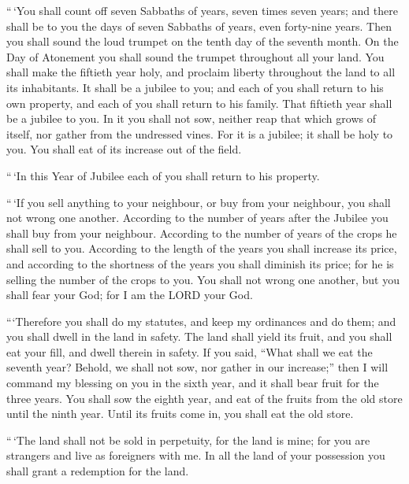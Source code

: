  ``\,`You shall count off seven Sabbaths of years, seven
times seven years; and there shall be to you the days of seven Sabbaths
of years, even forty-nine years.  Then you shall sound the
loud trumpet on the tenth day of the seventh month. On the Day of
Atonement you shall sound the trumpet throughout all your land.
 You shall make the fiftieth year holy, and proclaim
liberty throughout the land to all its inhabitants. It shall be a
jubilee to you; and each of you shall return to his own property, and
each of you shall return to his family.  That fiftieth year
shall be a jubilee to you. In it you shall not sow, neither reap that
which grows of itself, nor gather from the undressed vines.
 For it is a jubilee; it shall be holy to you. You shall
eat of its increase out of the field.

 ``\,`In this Year of Jubilee each of you shall return to
his property.

 ``\,`If you sell anything to your neighbour, or buy from
your neighbour, you shall not wrong one another.  According
to the number of years after the Jubilee you shall buy from your
neighbour. According to the number of years of the crops he shall sell
to you.  According to the length of the years you shall
increase its price, and according to the shortness of the years you
shall diminish its price; for he is selling the number of the crops to
you.  You shall not wrong one another, but you shall fear
your God; for I am the LORD your God.

 ```Therefore you shall do my statutes, and keep my
ordinances and do them; and you shall dwell in the land in safety.
 The land shall yield its fruit, and you shall eat your
fill, and dwell therein in safety.  If you said, ``What
shall we eat the seventh year? Behold, we shall not sow, nor gather in
our increase;''  then I will command my blessing on you in
the sixth year, and it shall bear fruit for the three years.
 You shall sow the eighth year, and eat of the fruits from
the old store until the ninth year. Until its fruits come in, you shall
eat the old store.

 ``\,`The land shall not be sold in perpetuity, for the
land is mine; for you are strangers and live as foreigners with me.
 In all the land of your possession you shall grant a
redemption for the land.

